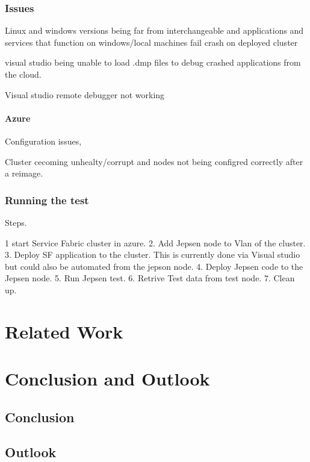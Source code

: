 \documentclass[a4paper,10pt,titlepage]{report}
\begin{document}
\subsection{Issues}

Linux and windows versions being far from interchangeable and applications and services that function on windows/local machines fail crash on deployed cluster

visual studio being unable to load .dmp files to debug crashed applications from the cloud.

Visual studio remote debugger not working

\subsubsection{Azure}

Configuration issues,

Cluster cecoming unhealty/corrupt and nodes not being configred correctly after a reimage.


\subsection{Running the test}

Steps.

1 start Service Fabric cluster in azure.
2. Add Jepsen node to Vlan of the cluster.
3. Deploy SF application to the cluster. This is currently done via Visual studio but could also be automated from the jepson node.
4. Deploy Jepsen code to the Jepsen node.
5. Run Jepsen test.
6. Retrive Test data from test node.
7. Clean up.



\chapter{Related Work}

\chapter{Conclusion and Outlook}
\section*{Conclusion}

\section*{Outlook}
\end{document}
